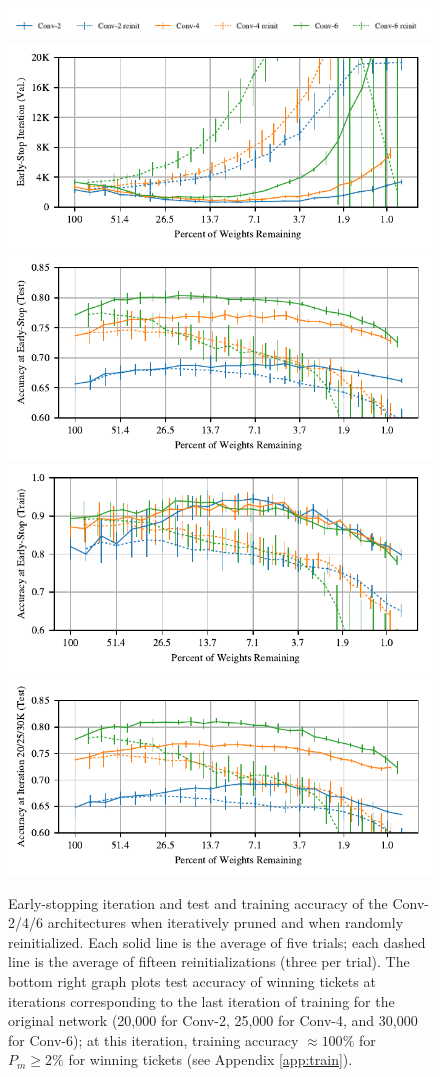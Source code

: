 \begin{figure}
\centering
\includegraphics[width=.8\textwidth]{graphs/cifar10/conv/conv_paperall_w/legend}%
\vspace{-1em}
\includegraphics[width=.5\textwidth]{graphs/cifar10/conv/conv_paperall_w/iteration}%
\includegraphics[width=.5\textwidth]{graphs/cifar10/conv/conv_paperall_w/accuracy}%
\vspace{-1em}
\includegraphics[width=.5\textwidth]{graphs/cifar10/conv/conv_paperall_w/train_accuracy}%
\includegraphics[width=.5\textwidth]{graphs/cifar10/conv/conv_paperall_w_last_iteration/accuracy}%
\vspace{-.5em}
\caption{Early-stopping iteration and test and training accuracy of the Conv-2/4/6 architectures when iteratively pruned and when
randomly reinitialized.
Each solid line is the average of five trials; each dashed line is the average of fifteen reinitializations
(three per trial). The bottom right graph plots test accuracy of winning tickets at iterations corresponding to the last iteration of training for the original network (20,000 for Conv-2, 25,000 for Conv-4, and 30,000 for Conv-6); at this iteration, training accuracy $\approx 100\%$ for $P_m \geq 2\%$ for winning tickets (see Appendix \ref{app:train}).}
\label{fig:question-1}
\end{figure}


